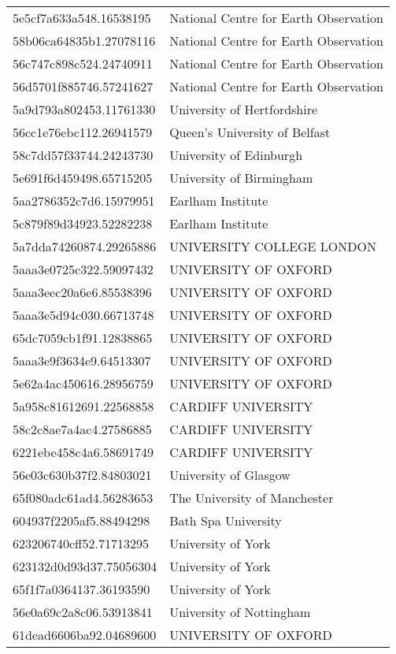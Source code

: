 \begin{tabular}{ll}
5e5cf7a633a548.16538195 & National Centre for Earth Observation \\
58b06ca64835b1.27078116 & National Centre for Earth Observation \\
56c747c898c524.24740911 & National Centre for Earth Observation \\
56d5701f885746.57241627 & National Centre for Earth Observation \\
5a9d793a802453.11761330 & University of Hertfordshire \\
56cc1e76ebc112.26941579 & Queen's University of Belfast \\
58c7dd57f33744.24243730 & University of Edinburgh \\
5e691f6d459498.65715205 & University of Birmingham \\
5aa2786352c7d6.15979951 & Earlham Institute \\
5c879f89d34923.52282238 & Earlham Institute \\
5a7dda74260874.29265886 & UNIVERSITY COLLEGE LONDON \\
5aaa3e0725c322.59097432 & UNIVERSITY OF OXFORD \\
5aaa3eec20a6e6.85538396 & UNIVERSITY OF OXFORD \\
5aaa3e5d94c030.66713748 & UNIVERSITY OF OXFORD \\
65dc7059cb1f91.12838865 & UNIVERSITY OF OXFORD \\
5aaa3e9f3634e9.64513307 & UNIVERSITY OF OXFORD \\
5e62a4ac450616.28956759 & UNIVERSITY OF OXFORD \\
5a958c81612691.22568858 & CARDIFF UNIVERSITY \\
58c2c8ae7a4ac4.27586885 & CARDIFF UNIVERSITY \\
6221ebe458c4a6.58691749 & CARDIFF UNIVERSITY \\
56e03c630b37f2.84803021 & University of Glasgow \\
65f080adc61ad4.56283653 & The University of Manchester \\
604937f2205af5.88494298 & Bath Spa University \\
623206740cff52.71713295 & University of York \\
623132d0d93d37.75056304 & University of York \\
65f1f7a0364137.36193590 & University of York \\
56e0a69c2a8c06.53913841 & University of Nottingham \\
61dead6606ba92.04689600 & UNIVERSITY OF OXFORD \\

\end{tabular}
